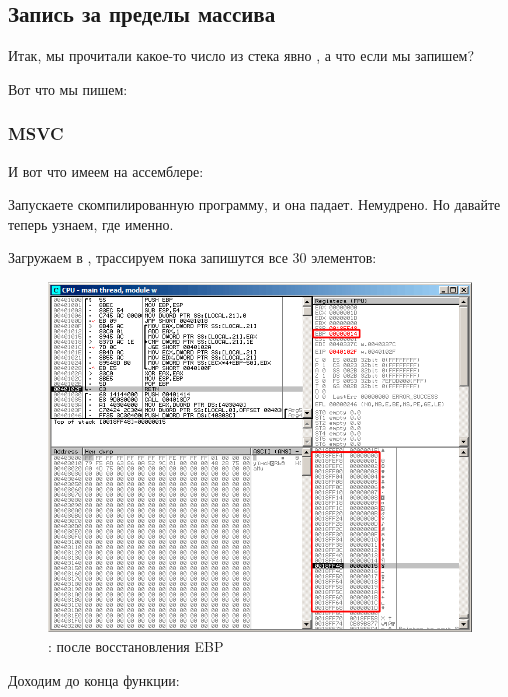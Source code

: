 \subsection{Запись за пределы массива}

Итак, мы прочитали какое-то число из стека явно , а что если мы запишем?

Вот что мы пишем:



\subsubsection{MSVC}

И вот что имеем на ассемблере:



Запускаете скомпилированную программу, и она падает. Немудрено. Но давайте теперь узнаем, где именно.

\clearpage
\myindex{\olly}

Загружаем в \olly, трассируем пока запишутся все 30 элементов:

\begin{figure}[H]
\centering
\includegraphics[scale=\FigScale]{patterns/13_arrays/2_BO/olly_w1.png}
\caption{\olly: после восстановления EBP}
\label{fig:array_BO_olly_w1}
\end{figure}

\clearpage
Доходим до конца функции:

